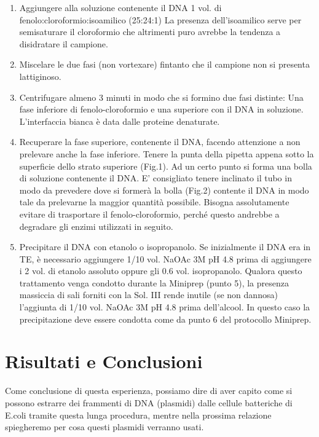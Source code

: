 \begin{enumerate}
  \item Aggiungere alla soluzione contenente il DNA 1 vol. di fenolo:cloroformio:isoamilico (25:24:1)
	La presenza dell’isoamilico serve per semisaturare il cloroformio che altrimenti puro avrebbe la
	tendenza a disidratare il campione.

  \item Miscelare le due fasi (non vortexare) fintanto che il campione non si presenta lattiginoso.

  \item Centrifugare almeno 3 minuti in modo che si formino due fasi distinte:
	Una fase inferiore di fenolo-cloroformio e una superiore con il DNA in soluzione.
	L’interfaccia bianca è data dalle proteine denaturate.

  \item Recuperare la fase superiore, contenente il DNA, facendo attenzione a non
	prelevare anche la fase inferiore. Tenere la punta della pipetta appena sotto la superficie
	dello strato superiore (Fig.1). Ad un certo punto si forma una bolla di soluzione contenente il DNA.
	E’ consigliato tenere inclinato il tubo in modo da prevedere dove si formerà la bolla (Fig.2) contente il DNA in modo
	tale da prelevarne la maggior quantità possibile. Bisogna assolutamente evitare di trasportare il fenolo-cloroformio,
	perché questo andrebbe a degradare gli enzimi utilizzati in seguito.

  \item Precipitare il DNA con etanolo o isopropanolo. Se inizialmente il DNA era in TE, è necessario aggiungere 1/10 vol.
	NaOAc 3M pH 4.8 prima di aggiungere i 2 vol. di etanolo assoluto oppure gli 0.6 vol. isopropanolo.
	Qualora questo trattamento venga condotto durante la Miniprep (punto 5), la presenza massiccia di sali forniti con
	la Sol. III  rende inutile (se non dannosa) l’aggiunta di 1/10 vol. NaOAc 3M pH 4.8 prima dell’alcool.
	In questo caso la precipitazione deve essere condotta come da punto 6 del protocollo Miniprep.


\end{enumerate}

\section{Risultati e Conclusioni}

Come conclusione di questa esperienza, possiamo dire di aver capito come si possono estrarre dei frammenti di DNA (plasmidi)
dalle cellule batteriche di E.coli tramite questa lunga procedura, mentre nella prossima relazione spiegheremo per cosa
questi plasmidi verranno usati.
